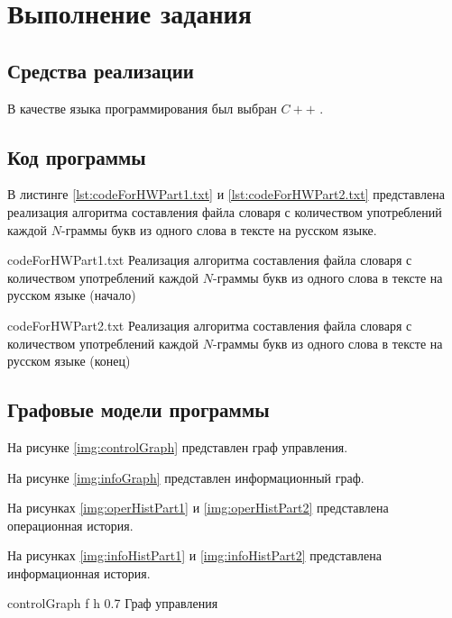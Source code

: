 \chapter{Выполнение задания}

\section{Средства реализации}

В качестве языка программирования был выбран $C++$ \cite{pl}.

\section{Код программы}

В листинге \ref{lst:codeForHWPart1.txt} и \ref{lst:codeForHWPart2.txt}  представлена реализация алгоритма составления файла словаря с количеством употреблений каждой $N$-граммы букв из одного слова в тексте на русском языке.

{codeForHWPart1.txt} %
{Реализация алгоритма составления файла словаря с количеством употреблений каждой $N$-граммы букв из одного слова в тексте на русском языке (начало)} %

{codeForHWPart2.txt} %
{Реализация алгоритма составления файла словаря с количеством употреблений каждой $N$-граммы букв из одного слова в тексте на русском языке (конец)} %


\section{Графовые модели программы}

На рисунке \ref{img:controlGraph} представлен граф управления.

На рисунке \ref{img:infoGraph} представлен информационный граф.

На рисунках \ref{img:operHistPart1} и \ref{img:operHistPart2} представлена операционная история.

На рисунках \ref{img:infoHistPart1} и \ref{img:infoHistPart2} представлена информационная история.

{controlGraph} %
{f} %
{h} %
{0.7\textwidth} %
{Граф управления} %

